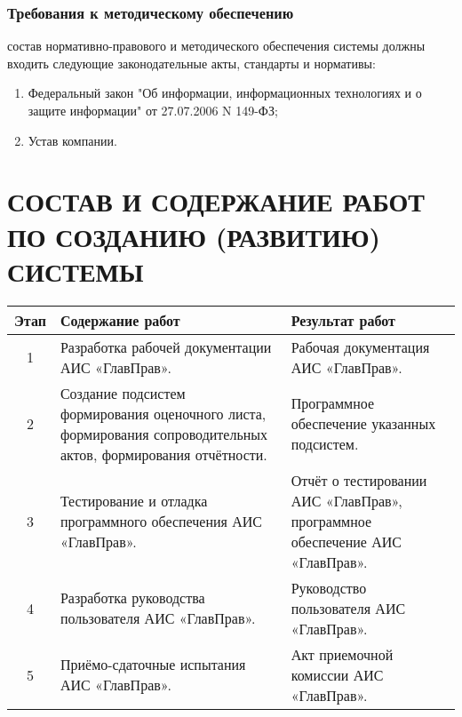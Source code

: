 \documentclass[russian, utf8, 12pt,pointsubsection,floatsubsection]{eskdtext}
\begin{document}
\subsubsection{Требования к методическому обеспечению}
 состав нормативно-правового и методического обеспечения системы должны входить следующие законодательные акты, стандарты и нормативы:
\begin{enumerate}
    \item Федеральный закон "Об информации, информационных технологиях и о защите информации" от 27.07.2006 N 149-ФЗ;
    \item Устав компании.

\end{enumerate}

\section{СОСТАВ И СОДЕРЖАНИЕ РАБОТ ПО СОЗДАНИЮ (РАЗВИТИЮ) СИСТЕМЫ}
\begin{tabular}{|c|p{8cm}|p{6cm}|}
    \hline
   Этап & Содержание работ & Результат работ \\
   \hline
    1 & Разработка рабочей документации  АИС «ГлавПрав». & Рабочая документация АИС «ГлавПрав».\\
    \hline
    2 & Создание подсистем формирования оценочного листа, формирования сопроводительных актов, формирования отчётности. & Программное обеспечение указанных подсистем.\\
    \hline
    3 & Тестирование и отладка программного обеспечения АИС «ГлавПрав». & Отчёт о тестировании АИС «ГлавПрав», программное обеспечение АИС «ГлавПрав».\\
    \hline
    4 & Разработка руководства пользователя АИС «ГлавПрав». & Руководство пользователя АИС «ГлавПрав».\\
    \hline
    5 & Приёмо-сдаточные испытания АИС «ГлавПрав». & Акт приемочной комиссии АИС «ГлавПрав».\\
    \hline

\end{tabular}
\end{document}
